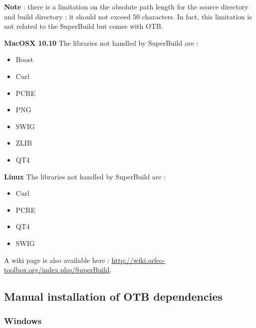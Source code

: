 \textbf{Note} : there is a limitation on the absolute path length for the source directory and build directory : it should not exceed 50 characters. In fact, this limitation is not related to the SuperBuild but comes with OTB.

\textbf{MacOSX 10.10}
\newline
The libraries not handled by SuperBuild are : 
\begin{itemize}
	\item Boost
	\item Curl
	\item PCRE
	\item PNG
	\item SWIG
	\item ZLIB
	\item QT4
\end{itemize}

\textbf{Linux}
\newline
The libraries not handled by SuperBuild are : 
\begin{itemize}
	\item Curl
	\item PCRE
	\item QT4
	\item SWIG
\end{itemize}

A wiki page is also available here : \url{http://wiki.orfeo-toolbox.org/index.php/SuperBuild}.

\subsection{Manual installation of OTB dependencies}
\label{sec:manualdependencies}

\subsubsection{Windows}

